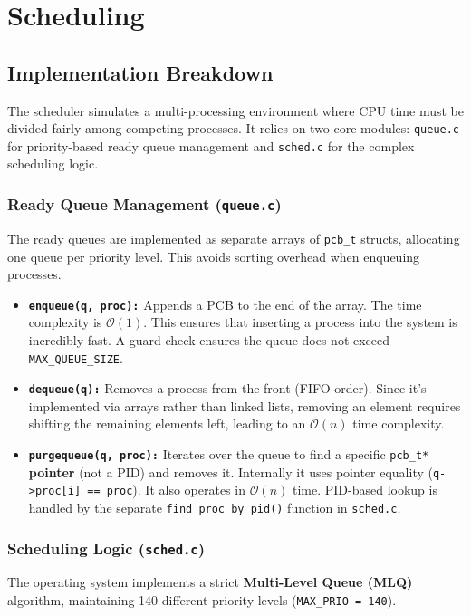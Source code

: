 \section{Scheduling}
\subsection{Implementation Breakdown}
The scheduler simulates a multi-processing environment where CPU time must be divided fairly among competing processes. It relies on two core modules: \texttt{queue.c} for priority-based ready queue management and \texttt{sched.c} for the complex scheduling logic.

\subsubsection{Ready Queue Management (\texttt{queue.c})}
The ready queues are implemented as separate arrays of \texttt{pcb\_t} structs, allocating one queue per priority level. This avoids sorting overhead when enqueuing processes.
\begin{itemize}
    \item \textbf{\texttt{enqueue(q, proc):}} Appends a PCB to the end of the array. The time complexity is $\mathcal{O}(1)$. This ensures that inserting a process into the system is incredibly fast. A guard check ensures the queue does not exceed \texttt{MAX\_QUEUE\_SIZE}.
    \item \textbf{\texttt{dequeue(q):}} Removes a process from the front (FIFO order). Since it's implemented via arrays rather than linked lists, removing an element requires shifting the remaining elements left, leading to an $\mathcal{O}(n)$ time complexity.
    \item \textbf{\texttt{purgequeue(q, proc):}} Iterates over the queue to find a specific \texttt{pcb\_t*} \textbf{pointer} (not a PID) and removes it. Internally it uses pointer equality (\texttt{q->proc[i] == proc}). It also operates in $\mathcal{O}(n)$ time. PID-based lookup is handled by the separate \texttt{find\_proc\_by\_pid()} function in \texttt{sched.c}.
\end{itemize}

\subsubsection{Scheduling Logic (\texttt{sched.c})}
The operating system implements a strict \textbf{Multi-Level Queue (MLQ)} algorithm, maintaining 140 different priority levels (\texttt{MAX\_PRIO = 140}).

